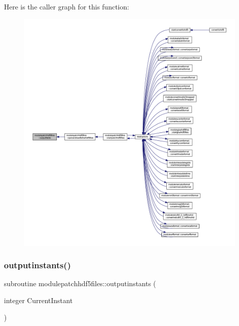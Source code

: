 Here is the caller graph for this function\+:\nopagebreak
\begin{figure}[H]
\begin{center}
\leavevmode
\includegraphics[width=350pt]{namespacemodulepatchhdf5files_a32322a9b20e258cf772b50096c520369_icgraph}
\end{center}
\end{figure}
\mbox{\label{namespacemodulepatchhdf5files_a5a84e7c89a2de8e50674a804e7e307b0}} 
\subsubsection{\texorpdfstring{outputinstants()}{outputinstants()}}
{\footnotesize\ttfamily subroutine modulepatchhdf5files\+::outputinstants (\begin{DoxyParamCaption}\item[{integer}]{Current\+Instant }\end{DoxyParamCaption})\hspace{0.3cm}{\ttfamily [private]}}

